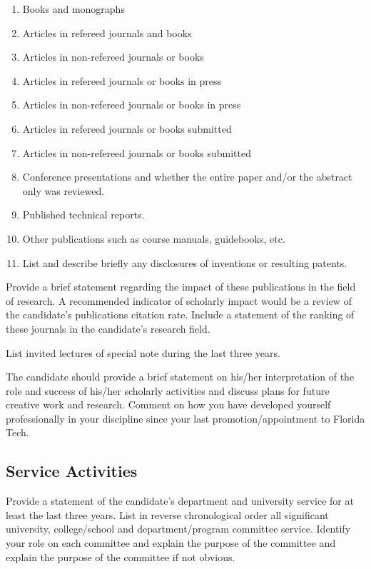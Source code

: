 \begin{enumerate}
\item Books and monographs
\item Articles in refereed journals and books
\item Articles in non-refereed journals or books
\item Articles in refereed journals or books in press
\item Articles in non-refereed journals or books in press
\item Articles in refereed journals or books submitted
\item Articles in non-refereed journals or books submitted
\item Conference presentations and whether the entire paper and/or the abstract only was reviewed.
\item Published technical reports.
\item Other publications such as course manuals, guidebooks, etc.
\item List and describe briefly any disclosures of inventions or resulting patents.
\end{enumerate}

Provide a brief statement regarding the impact of these publications in the field of research. A recommended indicator of scholarly impact would be a review of the candidate’s publications citation rate. Include a statement of the ranking of these journals in the candidate’s research field.

List invited lectures of special note during the last three years.

The candidate should provide a brief statement on his/her interpretation of the role and success of his/her scholarly activities and discuss plans for future creative work and research. Comment on how you have developed yourself professionally in your discipline since your last promotion/appointment to Florida Tech.

\subsection*{Service Activities}
Provide a statement of the candidate’s department and university service for at least the last three years. List in reverse chronological order all significant university, college/school and department/program committee service. Identify your role on each committee and explain the purpose of the committee and explain the purpose of the committee if not obvious.

